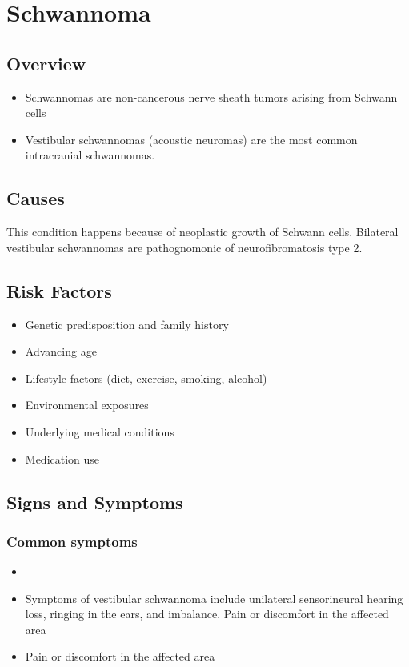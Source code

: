 \chapter{Schwannoma}
\label{sec:Schwannoma}

\section{Overview}


\begin{itemize}[noitemsep]
  \item Schwannomas are non-cancerous nerve sheath tumors arising from Schwann cells
  \item Vestibular schwannomas (acoustic neuromas) are the most common intracranial schwannomas.
\end{itemize}
\section{Causes}
This condition happens because of neoplastic growth of Schwann cells. Bilateral vestibular schwannomas are pathognomonic of neurofibromatosis type 2.     
\section{Risk Factors}

\begin{itemize}[noitemsep]
  \item Genetic predisposition and family history
  \item Advancing age
  \item Lifestyle factors (diet, exercise, smoking, alcohol)
  \item Environmental exposures
  \item Underlying medical conditions
  \item Medication use
\end{itemize}
\section{Signs and Symptoms}

\subsection{Common symptoms}
\begin{itemize}[noitemsep]
  \item \item Symptoms of vestibular schwannoma include unilateral sensorineural hearing loss, ringing in the ears, and imbalance. Pain or discomfort in the affected area    \item Pain or discomfort in the affected area
  \end{itemize}

